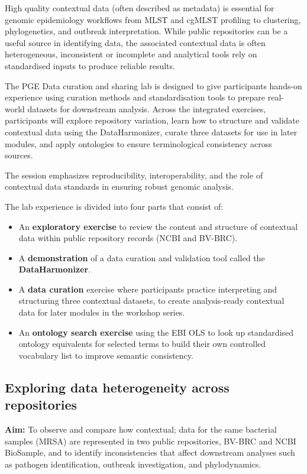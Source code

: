 \documentclass[
]{book}
\providecommand{\tightlist}{%
  \setlength{\itemsep}{0pt}\setlength{\parskip}{0pt}}
\begin{document}
High quality contextual data (often described as metadata) is essential for genomic epidemiology workflows from MLST and cgMLST profiling to clustering, phylogenetics, and outbreak interpretation. While public repositories can be a useful source in identifying data, the associated contextual data is often heterogeneous, inconsistent or incomplete and analytical tools rely on standardised inputs to produce reliable results.

The PGE Data curation and sharing lab is designed to give participants hands-on experience using curation methods and standardisation tools to prepare real-world datasets for downstream analysis. Across the integrated exercises, participants will explore repository variation, learn how to structure and validate contextual data using the DataHarmonizer, curate three datasets for use in later modules, and apply ontologies to ensure terminological consistency across sources.

The session emphasizes reproducibility, interoperability, and the role of contextual data standards in ensuring robust genomic analysis.

The lab experience is divided into four parts that consist of:

\begin{itemize}
\tightlist
\item
  An \textbf{exploratory exercise} to review the content and structure of contextual data within public repository records (NCBI and BV-BRC).
\item
  A \textbf{demonstration} of a data curation and validation tool called the \textbf{DataHarmonizer}.
\item
  A \textbf{data curation} exercise where participants practice interpreting and structuring three contextual datasets, to create analysis-ready contextual data for later modules in the workshop series.
\item
  An \textbf{ontology search exercise} using the EBI OLS to look up standardised ontology equivalents for selected terms to build their own controlled vocabulary list to improve semantic consistency.
\end{itemize}

\subsection{Exploring data heterogeneity across repositories}\label{exercise1}

\textbf{Aim:} To observe and compare how contextual; data for the same bacterial samples (MRSA) are represented in two public repositories, BV-BRC and NCBI BioSample, and to identify inconsistencies that affect downstream analyses such as pathogen identification, outbreak investigation, and phylodynamics.
\end{document}
